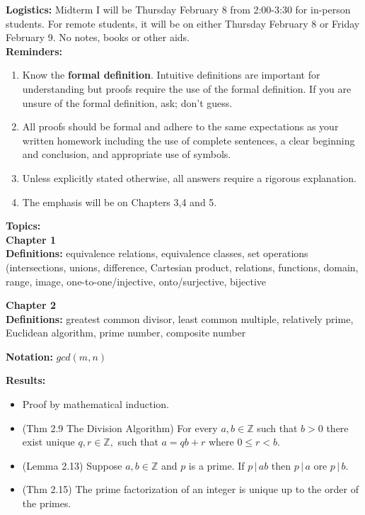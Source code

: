 \documentclass[12pt]{article}
\newcommand{\bbZ}{\mathbb{Z}}
\newcommand{\divs}{\, \big | \,}
\begin{document}
\textbf{Logistics:} Midterm I will be Thursday February 8 from 2:00-3:30 for in-person students. For remote students, it will be on either Thursday February 8 or Friday February 9. No notes, books or other aids.\\

\textbf{Reminders:}
\begin{enumerate}
	\item Know the \textbf{formal definition}. Intuitive definitions are important for understanding but proofs require the use of the formal definition. If you are unsure of the formal definition, ask; don't guess.
	\item All proofs should be formal and adhere to the same expectations as your written homework including the use of complete sentences, a clear beginning and conclusion, and appropriate use of symbols.
	\item Unless explicitly stated otherwise, all answers require a rigorous explanation.
	\item The emphasis will be on Chapters 3,4 and 5.
\end{enumerate}

\textbf{Topics:}\\

\noindent \textbf{Chapter 1}\\

\textbf{Definitions:} equivalence relations, equivalence classes, set operations (intersections, unions, difference, Cartesian product, relations, functions, domain, range, image, one-to-one/injective, onto/surjective, bijective


\noindent \textbf{Chapter 2}\\

\textbf{Definitions:} greatest common divisor, least common multiple, relatively prime, Euclidean algorithm, prime number, composite number

\textbf{Notation:} $gcd(m,n)$

\textbf{Results:}
\begin{itemize}
	\item Proof by mathematical induction.
	\item (Thm 2.9 The Division Algorithm) For every $a,b \in \bbZ$ such that $b >0$ there exist unique $q,r \in \bbZ,$ such that $a=qb+r$ where $0 \leq r <b.$
	\item (Lemma 2.13) Suppose $a,b \in \bbZ$ and $p$ is a prime. If $p \divs ab$ then $p \divs a$ ore $p \divs b.$
	\item (Thm 2.15) The prime factorization of an integer is unique up to the order of the primes.
\end{itemize}
\end{document}
